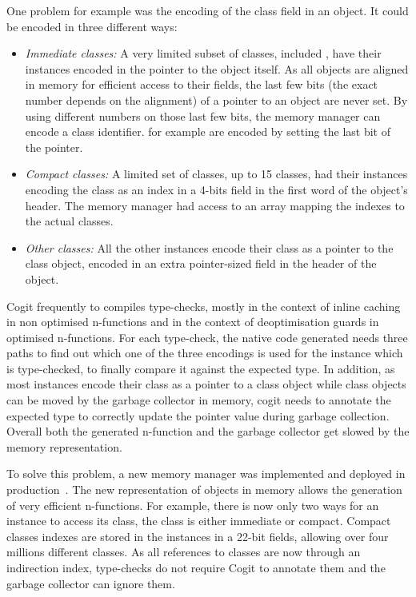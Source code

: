 \documentclass[a4paper,12pt,twoside]{../includes/ThesisStyle}
\begin{document}
One problem for example was the encoding of the class field in an object. It could be encoded in three different ways:
\begin{itemize}
	\item \emph{Immediate classes:} A very limited subset of classes, included , have their instances encoded in the pointer to the object itself. As all objects are aligned in memory for efficient access to their fields, the last few bits (the exact number depends on the alignment) of a pointer to an object are never set. By using different numbers on those last few bits, the memory manager can encode a class identifier.  for example are encoded by setting the last bit of the pointer.
	\item \emph{Compact classes:} A limited set of classes, up to 15 classes, had their instances encoding the class as an index in a 4-bits field in the first word of the object's header. The memory manager had access to an array mapping the indexes to the actual classes.
	\item \emph{Other classes:} All the other instances encode their class as a pointer to the class object, encoded in an extra pointer-sized field in the header of the object.
\end{itemize}

Cogit frequently to compiles type-checks, mostly in the context of inline caching in non optimised n-functions and in the context of deoptimisation guards in optimised n-functions. For each type-check, the native code generated needs three paths to find out which one of the three encodings is used for the instance which is type-checked, to finally compare it against the expected type. In addition, as most instances encode their class as a pointer to a class object while class objects can be moved by the garbage collector in memory, cogit needs to annotate the expected type to correctly update the pointer value during garbage collection. Overall both the generated n-function and the garbage collector get slowed by the memory representation.

To solve this problem, a new memory manager was implemented and deployed in production~\cite{Mir15a}. The new representation of objects in memory allows the generation of very efficient n-functions. For example, there is now only two ways for an instance to access its class, the class is either immediate or compact. Compact classes indexes are stored in the instances in a 22-bit fields, allowing over four millions different classes. As all references to classes are now through an indirection index, type-checks do not require Cogit to annotate them and the garbage collector can ignore them.
\end{document}
